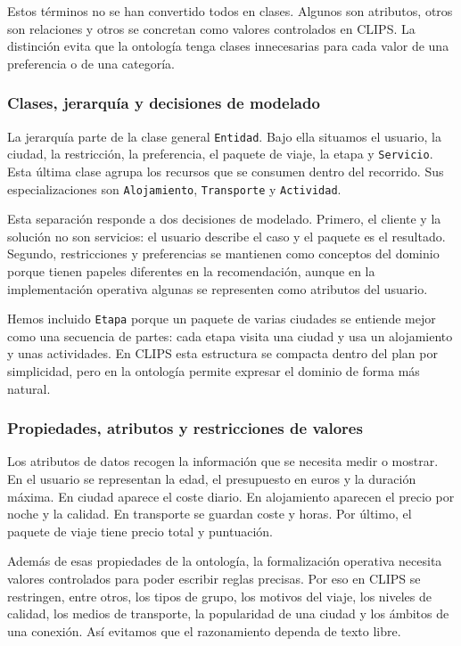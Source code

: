 \documentclass[11pt,a4paper]{article}
\begin{document}
Estos t\'erminos no se han convertido todos en clases. Algunos son atributos,
otros son relaciones y otros se concretan como valores controlados en CLIPS.
La distinci\'on evita que la ontolog\'ia tenga clases innecesarias para cada
valor de una preferencia o de una categor\'ia.

\subsubsection{Clases, jerarqu\'ia y decisiones de modelado}
La jerarqu\'ia parte de la clase general \texttt{Entidad}. Bajo ella situamos
el usuario, la ciudad, la restricci\'on, la preferencia, el paquete de viaje,
la etapa y \texttt{Servicio}. Esta \'ultima clase agrupa los recursos que se
consumen dentro del recorrido. Sus especializaciones son
\texttt{Alojamiento}, \texttt{Transporte} y \texttt{Actividad}.

Esta separaci\'on responde a dos decisiones de modelado. Primero, el cliente y
la soluci\'on no son servicios: el usuario describe el caso y el paquete es el
resultado. Segundo, restricciones y preferencias se mantienen como conceptos
del dominio porque tienen papeles diferentes en la recomendaci\'on, aunque en
la implementaci\'on operativa algunas se representen como atributos del
usuario.

Hemos incluido \texttt{Etapa} porque un paquete de varias ciudades se entiende
mejor como una secuencia de partes: cada etapa visita una ciudad y usa un
alojamiento y unas actividades. En CLIPS esta estructura se compacta dentro
del plan por simplicidad, pero en la ontolog\'ia permite expresar el dominio de
forma m\'as natural.

\subsubsection{Propiedades, atributos y restricciones de valores}
Los atributos de datos recogen la informaci\'on que se necesita medir o mostrar.
En el usuario se representan la edad, el presupuesto en euros y la duraci\'on
m\'axima. En ciudad aparece el coste diario. En alojamiento aparecen el precio
por noche y la calidad. En transporte se guardan coste y horas. Por \'ultimo,
el paquete de viaje tiene precio total y puntuaci\'on.

Adem\'as de esas propiedades de la ontolog\'ia, la formalizaci\'on operativa
necesita valores controlados para poder escribir reglas precisas. Por eso en
CLIPS se restringen, entre otros, los tipos de grupo, los motivos del viaje,
los niveles de calidad, los medios de transporte, la popularidad de una ciudad
y los \'ambitos de una conexi\'on. As\'i evitamos que el razonamiento dependa de
texto libre.
\end{document}
